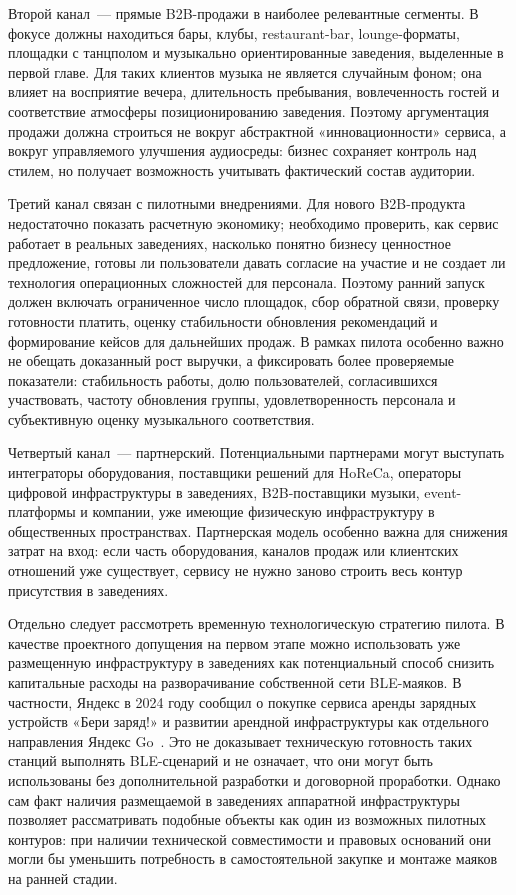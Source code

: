 Второй канал~--- прямые B2B-продажи в наиболее релевантные сегменты. В фокусе должны находиться бары, клубы, restaurant-bar, lounge-форматы, площадки с танцполом и музыкально ориентированные заведения, выделенные в первой главе. Для таких клиентов музыка не является случайным фоном; она влияет на восприятие вечера, длительность пребывания, вовлеченность гостей и соответствие атмосферы позиционированию заведения. Поэтому аргументация продажи должна строиться не вокруг абстрактной «инновационности» сервиса, а вокруг управляемого улучшения аудиосреды: бизнес сохраняет контроль над стилем, но получает возможность учитывать фактический состав аудитории.

Третий канал связан с пилотными внедрениями. Для нового B2B-продукта недостаточно показать расчетную экономику; необходимо проверить, как сервис работает в реальных заведениях, насколько понятно бизнесу ценностное предложение, готовы ли пользователи давать согласие на участие и не создает ли технология операционных сложностей для персонала. Поэтому ранний запуск должен включать ограниченное число площадок, сбор обратной связи, проверку готовности платить, оценку стабильности обновления рекомендаций и формирование кейсов для дальнейших продаж. В рамках пилота особенно важно не обещать доказанный рост выручки, а фиксировать более проверяемые показатели: стабильность работы, долю пользователей, согласившихся участвовать, частоту обновления группы, удовлетворенность персонала и субъективную оценку музыкального соответствия.

Четвертый канал~--- партнерский. Потенциальными партнерами могут выступать интеграторы оборудования, поставщики решений для HoReCa, операторы цифровой инфраструктуры в заведениях, B2B-поставщики музыки, event-платформы и компании, уже имеющие физическую инфраструктуру в общественных пространствах. Партнерская модель особенно важна для снижения затрат на вход: если часть оборудования, каналов продаж или клиентских отношений уже существует, сервису не нужно заново строить весь контур присутствия в заведениях.

Отдельно следует рассмотреть временную технологическую стратегию пилота. В качестве проектного допущения на первом этапе можно использовать уже размещенную инфраструктуру в заведениях как потенциальный способ снизить капитальные расходы на разворачивание собственной сети BLE-маяков. В частности, Яндекс в 2024 году сообщил о покупке сервиса аренды зарядных устройств «Бери заряд!» и развитии арендной инфраструктуры как отдельного направления Яндекс Go~\cite{yandex_beri_zaryad_2024}. Это не доказывает техническую готовность таких станций выполнять BLE-сценарий и не означает, что они могут быть использованы без дополнительной разработки и договорной проработки. Однако сам факт наличия размещаемой в заведениях аппаратной инфраструктуры позволяет рассматривать подобные объекты как один из возможных пилотных контуров: при наличии технической совместимости и правовых оснований они могли бы уменьшить потребность в самостоятельной закупке и монтаже маяков на ранней стадии.

